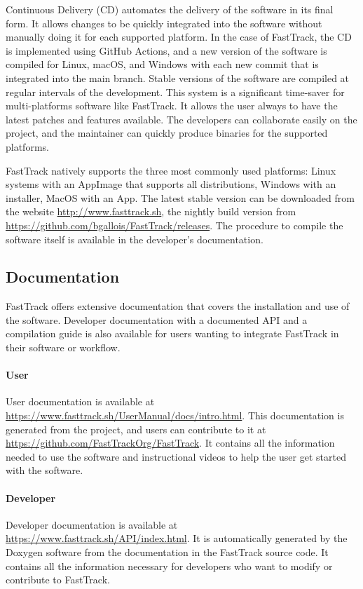     Continuous Delivery (CD) automates the delivery of the software in its final form. It allows changes to be quickly integrated into the software without manually doing it for each supported platform. In the case of FastTrack, the CD is implemented using GitHub Actions, and a new version of the software is compiled for Linux, macOS, and Windows with each new commit that is integrated into the main branch. Stable versions of the software are compiled at regular intervals of the development. This system is a significant time-saver for multi-platforms software like FastTrack. It allows the user always to have the latest patches and features available. The developers can collaborate easily on the project, and the maintainer can quickly produce binaries for the supported platforms.

    FastTrack natively supports the three most commonly used platforms: Linux systems with an AppImage that supports all distributions, Windows with an installer, MacOS with an App. The latest stable version can be downloaded from the website \url{http://www.fasttrack.sh}, the nightly build version from \url{https://github.com/bgallois/FastTrack/releases}. The procedure to compile the software itself is available in the developer's documentation.

    \subsection{Documentation}
    FastTrack offers extensive documentation that covers the installation and use of the software. Developer documentation with a documented API and a compilation guide is also available for users wanting to integrate FastTrack in their software or workflow.

    \paragraph{User} User documentation is available at \url{https://www.fasttrack.sh/UserManual/docs/intro.html}. This documentation is generated from the project, and users can contribute to it at \url{https://github.com/FastTrackOrg/FastTrack}. It contains all the information needed to use the software and instructional videos to help the user get started with the software.
    \paragraph{Developer} Developer documentation is available at \url{https://www.fasttrack.sh/API/index.html}. It is automatically generated by the Doxygen software from the documentation in the FastTrack source code. It contains all the information necessary for developers who want to modify or contribute to FastTrack.


